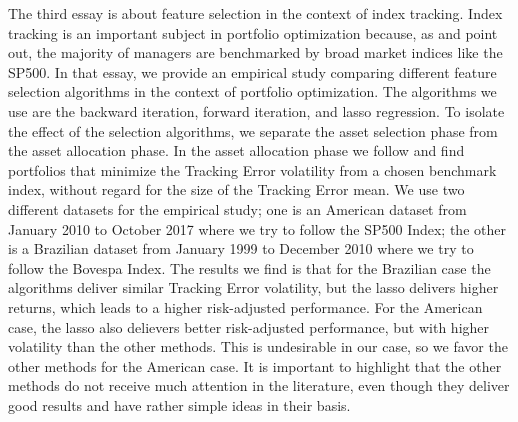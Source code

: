 \documentclass[12pt,oneside,a4paper]{memoir}
\begin{document}
The third essay is about feature selection in the context of index tracking.
Index tracking is an important subject in portfolio optimization because, as  and  point out, the majority of managers are benchmarked by broad market indices like the SP500.
In that essay, we provide an empirical study comparing different feature selection algorithms in the context of portfolio optimization.
The algorithms we use are the backward iteration, forward iteration, and lasso regression.
To isolate the effect of the selection algorithms, we separate the asset selection phase from the asset allocation phase.
In the asset allocation phase we follow  and find portfolios that minimize the Tracking Error volatility from a chosen benchmark index, without regard for the size of the Tracking Error mean.
We use two different datasets for the empirical study; one is an American dataset from January 2010 to October 2017 where we try to follow the SP500 Index; the other is a Brazilian dataset from January 1999 to December 2010 where we try to follow the Bovespa Index.
The results we find is that for the Brazilian case the algorithms deliver similar Tracking Error volatility, but the lasso delivers higher returns, which leads to a higher risk-adjusted performance.
For the American case, the lasso also delievers better risk-adjusted performance, but with higher volatility than the other methods.
This is undesirable in our case, so we favor the other methods for the American case.
It is important to highlight that the other methods do not receive much attention in the literature, even though they deliver good results and have rather simple ideas in their basis.

\postextual


\renewcommand\bibname{REFERENCES}


\end{document}
